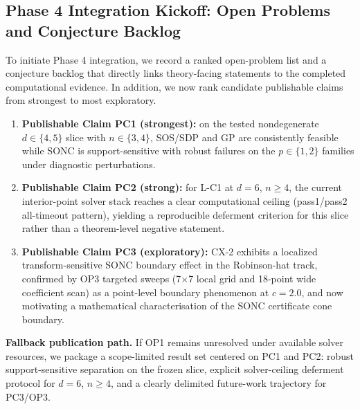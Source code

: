\documentclass{article}
\begin{document}
\subsection*{Phase 4 Integration Kickoff: Open Problems and Conjecture Backlog}
To initiate Phase 4 integration, we record a ranked open-problem list and a conjecture backlog
that directly links theory-facing statements to the completed computational evidence.
In addition, we now rank candidate publishable claims from strongest to most exploratory.
\begin{enumerate}
    \item \textbf{Publishable Claim PC1 (strongest):}
    on the tested nondegenerate $d\in\{4,5\}$ slice with $n\in\{3,4\}$,
    SOS/SDP and GP are consistently feasible while SONC is support-sensitive with robust
    failures on the $p\in\{1,2\}$ families under diagnostic perturbations.
    \item \textbf{Publishable Claim PC2 (strong):}
    for L-C1 at $d=6$, $n\geq 4$, the current interior-point solver stack reaches a clear
    computational ceiling (pass1/pass2 all-timeout pattern), yielding a reproducible deferment
    criterion for this slice rather than a theorem-level negative statement.
    \item \textbf{Publishable Claim PC3 (exploratory):}
    CX-2 exhibits a localized transform-sensitive SONC boundary effect in the Robinson-hat
    track, confirmed by OP3 targeted sweeps (7$\times$7 local grid and 18-point wide
    coefficient scan) as a point-level boundary phenomenon at $c=2.0$, and now motivating
    a mathematical characterisation of the SONC certificate cone boundary.
\end{enumerate}

\noindent\textbf{Fallback publication path.}
If OP1 remains unresolved under available solver resources, we package a scope-limited
result set centered on PC1 and PC2: robust support-sensitive separation on the frozen slice,
explicit solver-ceiling deferment protocol for $d=6$, $n\geq 4$, and a clearly delimited
future-work trajectory for PC3/OP3.
\end{document}
